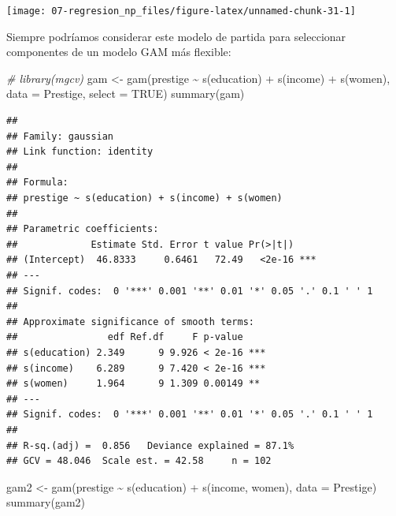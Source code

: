 \documentclass[
]{book}
\newenvironment{Shaded}{\begin{snugshade}}{\end{snugshade}}
\newcommand{\AttributeTok}[1]{\textcolor[rgb]{0.77,0.63,0.00}{#1}}
\newcommand{\CommentTok}[1]{\textcolor[rgb]{0.56,0.35,0.01}{\textit{#1}}}
\newcommand{\ConstantTok}[1]{\textcolor[rgb]{0.00,0.00,0.00}{#1}}
\newcommand{\FunctionTok}[1]{\textcolor[rgb]{0.00,0.00,0.00}{#1}}
\newcommand{\NormalTok}[1]{#1}
\newcommand{\OtherTok}[1]{\textcolor[rgb]{0.56,0.35,0.01}{#1}}
\newcommand{\SpecialCharTok}[1]{\textcolor[rgb]{0.00,0.00,0.00}{#1}}
\theoremstyle{break}
\theoremstyle{definition}
\theoremstyle{definition}
\theoremstyle{definition}
\theoremstyle{definition}
\theoremstyle{remark}
\begin{document}
\begin{center}\texttt{[image: 07-regresion\_np\_files/figure-latex/unnamed-chunk-31-1]} \end{center}

Siempre podríamos considerar este modelo de partida para seleccionar componentes de un modelo GAM más flexible:

\begin{Shaded}
\begin{Highlighting}[]
\CommentTok{\# library(mgcv)}
\NormalTok{gam }\OtherTok{\textless{}{-}} \FunctionTok{gam}\NormalTok{(prestige }\SpecialCharTok{\textasciitilde{}} \FunctionTok{s}\NormalTok{(education) }\SpecialCharTok{+} \FunctionTok{s}\NormalTok{(income) }\SpecialCharTok{+} \FunctionTok{s}\NormalTok{(women), }\AttributeTok{data =}\NormalTok{ Prestige, }\AttributeTok{select =} \ConstantTok{TRUE}\NormalTok{)}
\FunctionTok{summary}\NormalTok{(gam)}
\end{Highlighting}
\end{Shaded}

\begin{verbatim}
## 
## Family: gaussian 
## Link function: identity 
## 
## Formula:
## prestige ~ s(education) + s(income) + s(women)
## 
## Parametric coefficients:
##             Estimate Std. Error t value Pr(>|t|)    
## (Intercept)  46.8333     0.6461   72.49   <2e-16 ***
## ---
## Signif. codes:  0 '***' 0.001 '**' 0.01 '*' 0.05 '.' 0.1 ' ' 1
## 
## Approximate significance of smooth terms:
##                edf Ref.df     F p-value    
## s(education) 2.349      9 9.926 < 2e-16 ***
## s(income)    6.289      9 7.420 < 2e-16 ***
## s(women)     1.964      9 1.309 0.00149 ** 
## ---
## Signif. codes:  0 '***' 0.001 '**' 0.01 '*' 0.05 '.' 0.1 ' ' 1
## 
## R-sq.(adj) =  0.856   Deviance explained = 87.1%
## GCV = 48.046  Scale est. = 42.58     n = 102
\end{verbatim}

\begin{Shaded}
\begin{Highlighting}[]
\NormalTok{gam2 }\OtherTok{\textless{}{-}} \FunctionTok{gam}\NormalTok{(prestige }\SpecialCharTok{\textasciitilde{}} \FunctionTok{s}\NormalTok{(education) }\SpecialCharTok{+} \FunctionTok{s}\NormalTok{(income, women), }\AttributeTok{data =}\NormalTok{ Prestige)}
\FunctionTok{summary}\NormalTok{(gam2)}
\end{Highlighting}
\end{Shaded}
\end{document}
